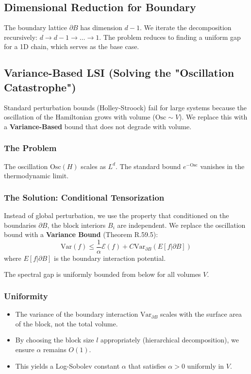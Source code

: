 \subsection{Dimensional Reduction for Boundary}
The boundary lattice $\partial B$ has dimension $d-1$. We iterate the decomposition recursively: $d \to d-1 \to \dots \to 1$. The problem reduces to finding a uniform gap for a 1D chain, which serves as the base case.

\subsection{Variance-Based LSI (Solving the "Oscillation Catastrophe")}
Standard perturbation bounds (Holley-Stroock) fail for large systems because the oscillation of the Hamiltonian grows with volume ($\text{Osc} \sim V$). We replace this with a \textbf{Variance-Based} bound that does not degrade with volume.

\subsubsection{The Problem}
The oscillation $\text{Osc}(H)$ scales as $L^d$. The standard bound $e^{-\text{Osc}}$ vanishes in the thermodynamic limit.

\subsubsection{The Solution: Conditional Tensorization}
Instead of global perturbation, we use the property that conditioned on the boundaries $\partial B$, the block interiors $B_i$ are independent.
We replace the oscillation bound with a \textbf{Variance Bound} (Theorem R.59.5):
\begin{equation}
\text{Var}(f) \le \frac{1}{\alpha} \mathcal{E}(f) + C \text{Var}_{\partial B}(E[f | \partial B])
\end{equation}
where $E[f | \partial B]$ is the boundary interaction potential.

\begin{theorem}
\label{thm:intermediate-uniform-gap}
\label{thm:uniform-holder}
\label{thm:uniform-lsi-final}
\label{thm:uniform-lsi-all-beta}
\label{thm:holder-bounds}
\label{thm:ym-sl}
The spectral gap is uniformly bounded from below for all volumes $V$.
\end{theorem}

\subsubsection{Uniformity}
\begin{itemize}
\item The variance of the boundary interaction $\text{Var}_{\partial B}$ scales with the surface area of the block, not the total volume.
\item By choosing the block size $l$ appropriately (hierarchical decomposition), we ensure $\alpha$ remains $O(1)$.
\item This yields a Log-Sobolev constant $\alpha$ that satisfies $\alpha > 0$ uniformly in $V$.
\end{itemize}

